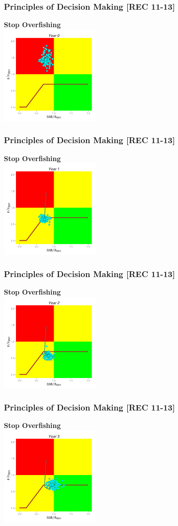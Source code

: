 \begin{frame}\frametitle{Principles of Decision Making [REC 11-13]} \smallskip\textbf{Stop Overfishing}\smallskip\\ \includegraphics[height=50mm,width=50mm]{hcrI1.png}\end{frame}
\begin{frame}\frametitle{Principles of Decision Making [REC 11-13]} \smallskip\textbf{Stop Overfishing}\smallskip\\ \includegraphics[height=50mm,width=50mm]{hcrI2.png}\end{frame}
\begin{frame}\frametitle{Principles of Decision Making [REC 11-13]} \smallskip\textbf{Stop Overfishing}\smallskip\\ \includegraphics[height=50mm,width=50mm]{hcrI3.png}\end{frame}
\begin{frame}\frametitle{Principles of Decision Making [REC 11-13]} \smallskip\textbf{Stop Overfishing}\smallskip\\ \includegraphics[height=50mm,width=50mm]{hcrI4.png}\end{frame}
